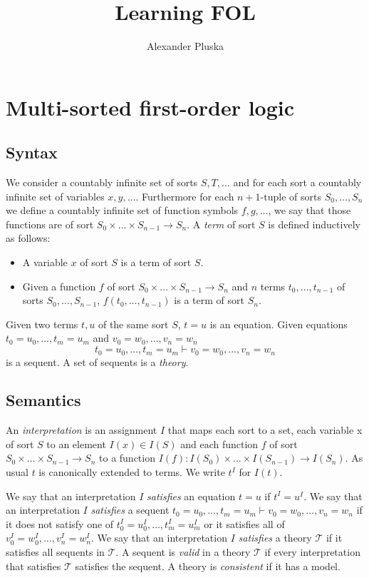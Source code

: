 \documentclass[11pt]{article}
\title{Learning FOL}
\author{Alexander Pluska}
\theoremstyle{definition}
\theoremstyle{definition}
\theoremstyle{definition}
\theoremstyle{definition}
\theoremstyle{definition}
\theoremstyle{definition}
\theoremstyle{definition}
\begin{document}
    \maketitle

    \section{Multi-sorted first-order logic}
    \subsection{Syntax}

    We consider a countably infinite set of sorts $S, T,\dots$ and for each sort a countably infinite set of variables $x, y,\dots$. Furthermore for each $n+1$-tuple of sorts $S_0,\dots, S_n$ we define a countably infinite set of function symbols $f, g,\dots$, we say that those functions are of sort $S_0\times\dots\times S_{n-1}\to S_n$. A \emph{term} of sort $S$ is defined inductively as follows:
    \begin{itemize}
        \item A variable $x$ of sort $S$ is a term of sort $S$.
        \item Given a function $f$ of sort $S_0\times\dots\times S_{n-1}\to S_n$ and $n$ terms $t_0,\dots, t_{n-1}$ of sorts $S_0,\dots, S_{n-1}$,  $f(t_0,\dots, t_{n-1})$ is a term of sort $S_n$.
    \end{itemize}
    Given two terms $t, u$ of the same sort $S$, $t=u$ is an equation. Given equations $t_0=u_0,\dots, t_m=u_m$ and $v_0=w_0,\dots,v_n=w_n$
    $$t_0=u_0,\dots, t_m=u_m\vdash v_0=w_0,\dots,v_n=w_n$$
    is a sequent. A set of sequents is a \emph{theory}.

    \subsection{Semantics}
    An \emph{interpretation} is an assignment $I$ that maps each sort to a set, each variable x of sort $S$ to an element $I(x)\in I(S)$ and each function $f$ of sort $S_0\times\dots\times S_{n-1}\to S_n$ to a function $I(f):I(S_0)\times\dots\times I(S_{n-1})\to I(S_n)$. As usual $t$ is canonically extended to terms. We write $t^I$ for $I(t)$.
    
    We say that an interpretation $I$ \emph{satisfies} an equation $t=u$ if $t^I=u^I$. We say that an interpretation $I$ \emph{satisfies} a sequent $t_0=u_0,\dots, t_m=u_m\vdash v_0=w_0,\dots,v_n=w_n$ if it does not satisfy one of $t_0^I=u_0^I,\dots, t_m^I=u_m^I$ or it satisfies all of $v_0^I=w_0^I,\dots,v_n^I=w_n^I$. We say that an interpretation $I$ \emph{satisfies} a theory $\mathcal{T}$ if it satisfies all sequents in $\mathcal{T}$. A sequent is \emph{valid} in a theory $\mathcal{T}$ if every interpretation that satisfies $\mathcal{T}$ satisfies the sequent. A theory is \emph{consistent} if it has a model.
\end{document}
